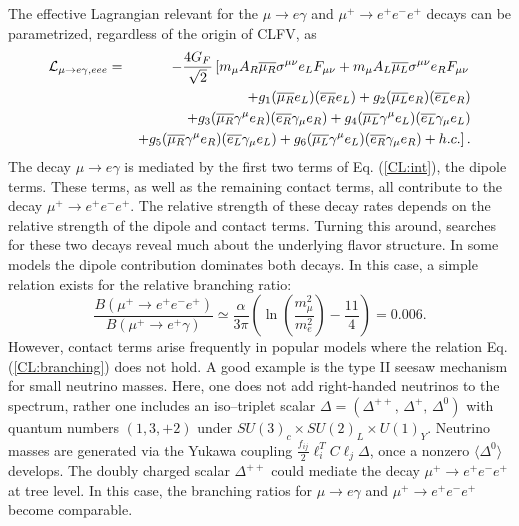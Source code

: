 The effective Lagrangian relevant for the $\mu \rightarrow e\gamma$ and $\mu^+ \rightarrow e^+e^-e^+$ decays can be parametrized,
regardless of the origin of CLFV, as
\begin{eqnarray}
{\cal L}_{\mu\rightarrow e\gamma, eee} &=& -{4G_{F}\over\sqrt{2}}
\left[  {m_{\mu }}{A_R}\overline{\mu_{R}}
        {{\sigma }^{\mu \nu}{e_L}{F_{\mu \nu}}}
       + {m_{\mu }}{A_L}\overline{\mu_{L}}
        {{\sigma }^{\mu \nu}{e_R}{F_{\mu \nu}}} \right. \nonumber \\
    && + {g_1}(\overline{{{\mu }_R}}{e_L})
              (\overline{{e_R}}{e_L})
       + {g_2}(\overline{{{\mu }_L}}{e_R})
              (\overline{{e_L}}{e_R}) \nonumber \\
    &&   +{g_3}(\overline{{{\mu }_R}}{{\gamma }^{\mu }}{e_R})
              (\overline{{e_R}}{{\gamma }_{\mu }}{e_R})
       + {g_4}(\overline{{{\mu }_L}}{{\gamma }^{\mu }}{e_L})
              (\overline{{e_L}}{{\gamma }_{\mu }}{e_L})  \nonumber \\
    && \left.  +{g_5}(\overline{{{\mu }_R}}{{\gamma }^{\mu }}{e_R})
              (\overline{{e_L}}{{\gamma }_{\mu }}{e_L})
       + {g_6}(\overline{{{\mu }_L}}{{\gamma }^{\mu }}{e_L})
              (\overline{{e_R}}{{\gamma }_{\mu }}{e_R})
       +  h.c. \right].
       \label{CL:int}
\end{eqnarray}
The decay $\mu \rightarrow e\gamma$ is mediated by the first two terms 
of Eq. (\ref{CL:int}), the dipole terms.  These
terms, as well as the remaining contact terms, all contribute to the 
decay $\mu^+ \rightarrow e^+e^-e^+$.  The relative strength of
these decay rates depends on the relative strength of the dipole and contact terms. 
 Turning this around, searches for
these two decays reveal much about the underlying flavor structure.  
In some models the dipole contribution 
dominates both decays.  In this case, a simple relation
exists for the relative branching ratio:
\begin{equation}
\frac{B(\mu^{+}\rightarrow e^{+}e^{-}e^{+})}{B(\mu^{+} \rightarrow
e^{+} \gamma)} \simeq
\frac{\alpha}{3\pi}\left(\ln(\frac{m_{\mu}^{2}}{m_{e}^{2}})-\frac{11}{4}\right)
= 0.006.
\label{CL:branching}
\end{equation}
However, contact terms arise
frequently in popular models where the relation
Eq. (\ref{CL:branching}) does not hold.  A good example is the type II seesaw mechanism for small neutrino masses.  Here, one
does not add right-handed neutrinos to the spectrum, rather one
includes an iso--triplet scalar $\Delta = (\Delta^{++},\,\Delta^+,\,\Delta^0)$ with quantum numbers
$(1,3,+2)$ under $SU(3)_c \times SU(2)_L \times U(1)_Y$.  Neutrino
masses are generated via the Yukawa coupling $\frac{f_{ij}}{2}
\ell_i^T C \ell_j \Delta$, once a nonzero $\langle
\Delta^0\rangle$ develops.  The doubly charged scalar
$\Delta^{++}$ could mediate the decay $\mu^+
\rightarrow e^+e^-e^+$ at tree level.  In this case, the branching ratios for $\mu
\rightarrow e\gamma$ and $\mu^+ \rightarrow e^+e^-e^+$ become comparable.

